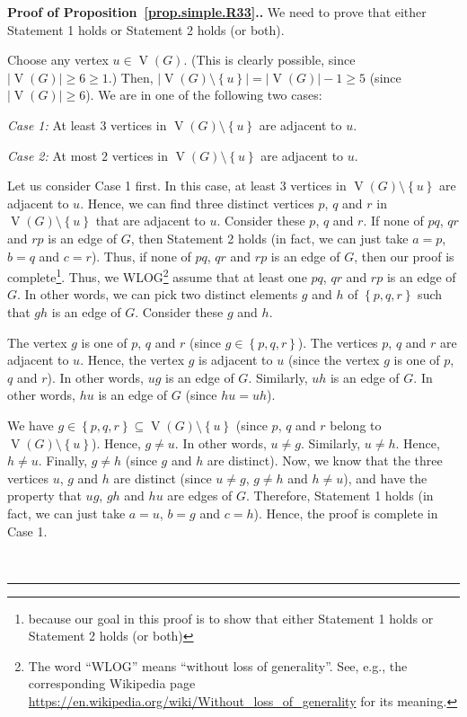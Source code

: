 \documentclass[numbers=enddot,12pt,final,onecolumn,notitlepage]{scrartcl}%
\theoremstyle{definition}
\newenvironment{proof}[1][Proof]{\noindent\textbf{#1.} }{\ \rule{0.5em}{0.5em}}
\newcommand{\set}[1]{\left\{ #1 \right\}}
\newcommand{\abs}[1]{\left| #1 \right|}
\newcommand{\verts}[1]{\operatorname{V}\left( #1 \right)}
\begin{document}
\begin{proof}[Proof of Proposition~\ref{prop.simple.R33}.]We need to
prove that either Statement 1 holds or Statement 2 holds (or both).

Choose any vertex $u \in \verts{G}$. (This is clearly possible,
since $\abs{\verts{G}} \geq 6 \geq 1$.) Then,
$\abs{\verts{G} \setminus \set{u}} = \abs{\verts{G}} - 1 \geq 5$
(since $\abs{\verts{G}} \geq 6$). We are in one of the following two
cases:

\textit{Case 1:} At least $3$ vertices in
$\verts{G} \setminus \set{u}$ are adjacent to $u$.

\textit{Case 2:} At most $2$ vertices in
$\verts{G} \setminus \set{u}$ are adjacent to $u$.

Let us consider Case 1 first. In this case, at least $3$ vertices in
$\verts{G} \setminus \set{u}$ are adjacent to $u$. Hence, we can find
three distinct vertices $p$, $q$ and $r$ in
$\verts{G} \setminus \set{u}$ that are adjacent to $u$. Consider
these $p$, $q$ and $r$. If none of $pq$, $qr$ and $rp$ is an edge of
$G$, then Statement 2 holds (in fact, we can just take $a = p$,
$b = q$ and $c = r$). Thus, if none of $pq$, $qr$ and $rp$ is an edge
of $G$, then our proof is complete\footnote{because our goal in this
proof is to show that either Statement 1 holds or Statement 2 holds
(or both)}. Thus, we WLOG\footnote{The word ``WLOG'' means
``without loss of generality''. See, e.g., the corresponding Wikipedia
page \url{https://en.wikipedia.org/wiki/Without_loss_of_generality}
for its meaning.} assume that at least one $pq$, $qr$ and $rp$ is an
edge of $G$. In other words, we can pick two distinct elements $g$
and $h$ of $\set{p, q, r}$ such that $gh$ is an edge of $G$. Consider
these $g$ and $h$.

The vertex $g$ is one of $p$, $q$ and $r$
(since $g \in \set{p, q, r}$).
The vertices $p$, $q$ and $r$ are adjacent to $u$. Hence, the vertex
$g$ is adjacent to $u$ (since the vertex $g$ is one of $p$, $q$ and
$r$). In other words, $ug$ is an edge of $G$. Similarly, $uh$ is an
edge of $G$. In other words, $hu$ is an edge of $G$ (since $hu = uh$).

We have $g \in \set{p, q, r} \subseteq \verts{G} \setminus \set{u}$
(since $p$, $q$ and $r$ belong to $\verts{G} \setminus \set{u}$).
Hence, $g \neq u$. In other words, $u \neq g$.
Similarly,
$u \neq h$. Hence, $h \neq u$. Finally, $g \neq h$ (since $g$ and $h$
are distinct). Now, we know that the three vertices $u$, $g$ and $h$
are distinct (since $u \neq g$, $g \neq h$ and $h \neq u$), and have
the property that $ug$, $gh$ and $hu$ are edges of $G$. Therefore,
Statement 1 holds (in fact, we can just take $a = u$, $b = g$ and
$c = h$). Hence, the proof is complete in Case 1.


\end{proof}
\end{document}
